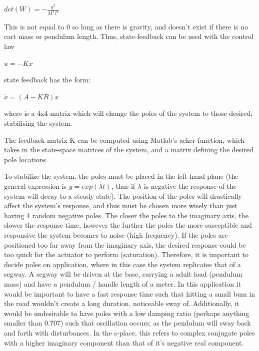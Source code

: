 \documentclass[12pt]{article}
\begin{document}
\vspace{\baselineskip}


$det(W) = -\frac{g^2}{M^4\, l^4}$


\vspace{\baselineskip}


This is not equal to 0 so long as there is gravity, and doesn't exist if there is no cart mass or pendulum length. Thus, state-feedback can be used with the control law 


\vspace{\baselineskip}


$u = - K x $


\vspace{\baselineskip}


state feedback has the form:


\vspace{\baselineskip}


$\dot{x} = (A - K B) x$


\vspace{\baselineskip}


where is a 4x4 matrix which will change the poles of the system to those desired; stabilising the system.


\vspace{\baselineskip}


The feedback matrix K can be computed using Matlab's acker function, which takes in the state-space matrices of the system, and a matrix defining the desired pole locations.


\vspace{\baselineskip}


To stabilize the system, the poles must be placed in the left hand plane (the general expression is $y = exp(\lambda t)$, thus if $\lambda$ is negative the response of the system will decay to a steady state). The position of the poles will drastically affect the system's response, and thus must be chosen more wisely than just having 4 random negative poles. The closer the poles to the imaginary axis, the slower the response time, however the further the poles the more susceptible and responsive the system becomes to noise (high frequency). If the poles are positioned too far away from the imaginary axis, the desired response could be too quick for the actuator to perform (saturation). Therefore, it is important to decide poles on application, where in this case the system replicates that of a segway. A segway will be driven at the base, carrying a adult load (pendulum mass) and have a pendulum / handle length of a meter. In this application it would be important to have a fast response time such that hitting a small bum in the road wouldn't create a long duration, noticeable sway of. Additionally, it would be undesirable to have poles with a low damping ratio (perhaps anything smaller than 0.707) such that oscillation occurs; as the pendulum will sway back and forth with disturbances. In the s-place, this refers to complex conjugate poles with a higher imaginary component than that of it's negative real component.
\end{document}
